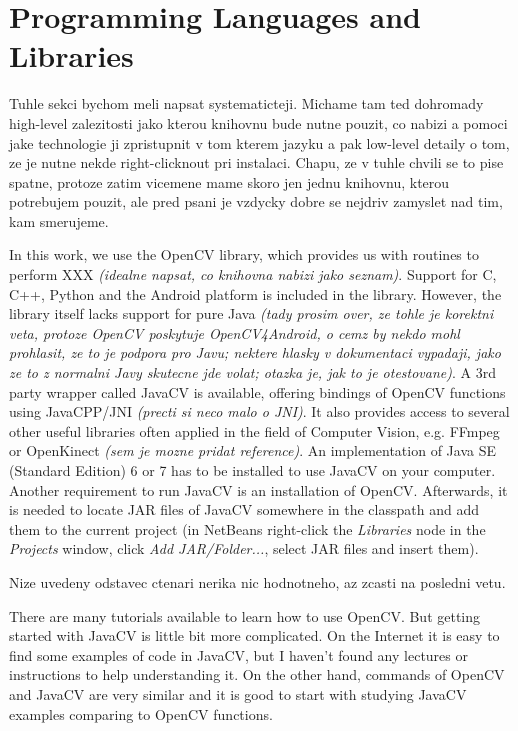 \documentclass[12pt]{article}
\newcommand{\lm}[1]{\textcolor{OliveGreen}{\begin{framed}#1\end{framed}}}
\newcommand{\lmv}[1]{\textit{\textcolor{OliveGreen}{(#1)}}}
\begin{document}
	\section{Programming Languages and Libraries}
	\lm{Tuhle sekci bychom meli napsat systematicteji. Michame tam ted dohromady high-level zalezitosti jako kterou knihovnu bude nutne pouzit, co nabizi a pomoci jake technologie ji zpristupnit v tom kterem jazyku a pak low-level detaily o tom, ze je nutne nekde right-clicknout pri instalaci. Chapu, ze v tuhle chvili se to pise spatne, protoze zatim vicemene mame skoro jen jednu knihovnu, kterou potrebujem pouzit, ale pred psani je vzdycky dobre se nejdriv zamyslet nad tim, kam smerujeme.}
	In this work, we use the OpenCV library, which provides us with routines to perform XXX \lmv{idealne napsat, co knihovna nabizi jako seznam}. 
	Support for C, C++, Python and the Android platform is included in the library. 
	However, the library itself lacks support for pure Java \lmv{tady prosim over, ze tohle je korektni veta, protoze OpenCV poskytuje OpenCV4Android, o cemz by nekdo mohl prohlasit, ze to je podpora pro Javu; nektere hlasky v dokumentaci vypadaji, jako ze to z normalni Javy skutecne jde volat; otazka je, jak to je otestovane}. 
	A 3rd party wrapper called JavaCV is available, offering bindings of OpenCV functions using JavaCPP/JNI \lmv{precti si neco malo o JNI}. 
	It also provides access to several other useful libraries often applied in the field of Computer Vision, e.g. FFmpeg or OpenKinect \lmv{sem je mozne pridat reference}. 
	An implementation of Java SE (Standard Edition) 6 or 7 has to be installed to use JavaCV on your computer. Another requirement to run JavaCV is an installation of OpenCV. 
Afterwards, it is needed to locate JAR files of JavaCV somewhere in the classpath  
and add them to the current project (in NetBeans right-click the {\itshape Libraries} node in the {\itshape Projects} window, click {\itshape Add JAR/Folder...}, select JAR files and insert them).
	\lm{Nize uvedeny odstavec ctenari nerika nic hodnotneho, az zcasti na posledni vetu.} 
	There are many tutorials available to learn how to use OpenCV. But getting started with JavaCV is little bit more complicated. On the Internet it is easy to find some examples of code in JavaCV, but I haven't found any lectures or instructions to help understanding it. On the other hand, commands of OpenCV and JavaCV are very similar and it is good to start with studying JavaCV examples comparing to OpenCV functions. 
\end{document}
